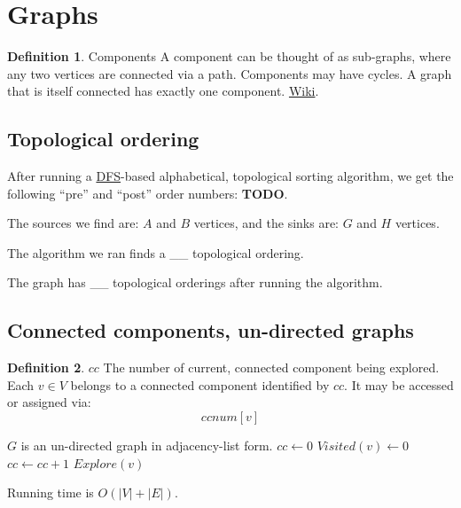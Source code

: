 \documentclass{article}
\theoremstyle{definition}
\newtheorem{definition}{Definition}[section]
\begin{document}
	
\tableofcontents
\listofalgorithms
\section{Graphs}

\begin{definition}{Components}
	A component can be thought of as sub-graphs, where any two vertices are connected via a path. Components may have cycles. A graph that is itself connected has exactly one component.
	\href{https://en.wikipedia.org/wiki/Component_(graph_theory)}{Wiki}. 
\end{definition}

\subsection{Topological ordering}

After running a \hyperref[alg:dfs_dir]{DFS}-based alphabetical, topological sorting algorithm, we get the following ``pre'' and ``post'' order numbers: \textbf{TODO}.

The sources we find are: $A$ and $B$ vertices, and the sinks are: $G$ and $H$ vertices. 

The algorithm we ran finds a \_\_ topological ordering. 

The graph has \_\_ topological orderings after running the algorithm.

\subsection{Connected components, un-directed graphs}
\label{cc_und}

\begin{definition}{$cc$}
The number of current, connected component being explored. Each $v \in V$ belongs to a connected component identified by $cc$. It may be accessed or assigned via:
$$ccnum[v]$$
\end{definition}

\begin{algorithm}[H]
\caption{$DFS(G)$: Given vertices $V$ in graph $G$, find all strongly connected components.}
\label{alg:dfs_und}
\begin{algorithmic}[1]
\REQUIRE $G$ is an un-directed graph in adjacency-list form.
\STATE $cc \gets 0$
\STATE $Visited(v) \gets 0$
\ENDFOR
{}
	\STATE $cc \gets cc + 1$
	\STATE $Explore(v)$ 
\ENDIF
\ENDFOR
\end{algorithmic}
 Running time is $O(|V|+|E|)$.
\end{algorithm}
\end{document}
